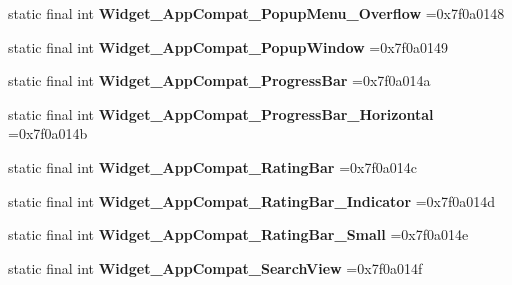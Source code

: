 \begin{DoxyCompactItemize}
\mbox{\label{classproject4_1_1xaria_1_1R_1_1style_a3abdf5ee633399ceb63e84a8c6f7e524}} 
static final int {\bfseries Widget\+\_\+\+App\+Compat\+\_\+\+Popup\+Menu\+\_\+\+Overflow} =0x7f0a0148
\item 
\mbox{\label{classproject4_1_1xaria_1_1R_1_1style_a0a2276fcfc25c3fee1c2ad85c5da642b}} 
static final int {\bfseries Widget\+\_\+\+App\+Compat\+\_\+\+Popup\+Window} =0x7f0a0149
\item 
\mbox{\label{classproject4_1_1xaria_1_1R_1_1style_a8a092d4f43a30bd26c47a544aec6f1a3}} 
static final int {\bfseries Widget\+\_\+\+App\+Compat\+\_\+\+Progress\+Bar} =0x7f0a014a
\item 
\mbox{\label{classproject4_1_1xaria_1_1R_1_1style_a5682cc2a8d0a24ebc57f91208f93e705}} 
static final int {\bfseries Widget\+\_\+\+App\+Compat\+\_\+\+Progress\+Bar\+\_\+\+Horizontal} =0x7f0a014b
\item 
\mbox{\label{classproject4_1_1xaria_1_1R_1_1style_ac9b48f4c616ab7241af005836c84eae1}} 
static final int {\bfseries Widget\+\_\+\+App\+Compat\+\_\+\+Rating\+Bar} =0x7f0a014c
\item 
\mbox{\label{classproject4_1_1xaria_1_1R_1_1style_a82a42b04c81658e69215c698e3a4e38f}} 
static final int {\bfseries Widget\+\_\+\+App\+Compat\+\_\+\+Rating\+Bar\+\_\+\+Indicator} =0x7f0a014d
\item 
\mbox{\label{classproject4_1_1xaria_1_1R_1_1style_aac7a85d882dcace47dacffeccecfcdbc}} 
static final int {\bfseries Widget\+\_\+\+App\+Compat\+\_\+\+Rating\+Bar\+\_\+\+Small} =0x7f0a014e
\item 
\mbox{\label{classproject4_1_1xaria_1_1R_1_1style_a64c0ecc44ff4bcd5a32ad96262bf1ed4}} 
static final int {\bfseries Widget\+\_\+\+App\+Compat\+\_\+\+Search\+View} =0x7f0a014f
\item 
\mbox{\label{classproject4_1_1xaria_1_1R_1_1style_a5d7814bc906b1244f8d77a0259af04f3}} 

\end{DoxyCompactItemize}
